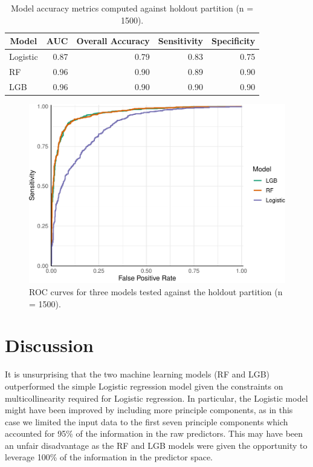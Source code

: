 \documentclass[]{elsarticle} %
\begin{document}
\begin{table}

\caption{\label{tab:metrics}Model accuracy metrics computed against holdout partition (n = 1500).}
\centering
\fontsize{12}{14}\selectfont
\begin{tabular}[t]{lrrrr}
\toprule
\multicolumn{1}{c}{Model} & \multicolumn{1}{c}{AUC} & \multicolumn{1}{c}{Overall Accuracy} & \multicolumn{1}{c}{Sensitivity} & \multicolumn{1}{c}{Specificity}\\
\midrule
Logistic & 0.87 & 0.79 & 0.83 & 0.75\\
\addlinespace
RF & 0.96 & 0.90 & 0.89 & 0.90\\
\addlinespace
LGB & 0.96 & 0.90 & 0.90 & 0.90\\
\bottomrule
\end{tabular}
\end{table}

\begin{figure}
\includegraphics[width=1\linewidth]{report_files/figure-latex/roc-1} \caption{ROC curves for three models tested against the holdout partition (n = 1500).}\label{fig:roc}
\end{figure}

\hypertarget{discussion}{%
\section{Discussion}\label{discussion}}

It is unsurprising that the two machine learning models (RF and LGB)
outperformed the simple Logistic regression model given the constraints
on multicollinearity required for Logistic regression.
In particular, the Logistic model might have been improved by including more
principle components, as in this case we limited the input data to the first
seven principle components which accounted for 95\% of the information in the
raw predictors.
This may have been an unfair disadvantage as the RF and LGB models were given
the opportunity to leverage 100\% of the information in the predictor space.
\end{document}
